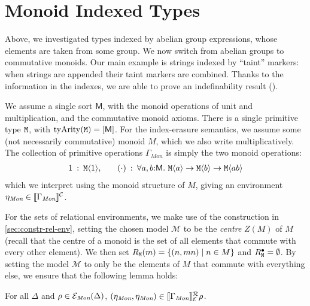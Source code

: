 \section{Monoid Indexed Types}
\label{sec:monoid-indexed-types}

\newcommand{\Mon}{\textit{Mon}}

Above, we investigated types indexed by abelian group expressions,
whose elements are taken from some group. We now switch from abelian
groups to commutative monoids.  Our main example is strings indexed by
``taint'' markers: when strings are appended their taint markers are
combined. Thanks to the information in the indexes, we are able to
prove an indefinability result ().

We assume a single sort $\mathsf{M}$, with the monoid operations of
unit and multiplication, and the commutative monoid axioms. There is a
single primitive type $\texttt{M}$, with $\mathrm{tyArity}(\texttt{M})
= [\mathsf{M}]$. For the index-erasure semantics, we assume some (not
necessarily commutative) monoid $M$, which we also write
multiplicatively. The collection of primitive operations
$\Gamma_{\mathit{Mon}}$ is simply the two monoid operations:
\begin{displaymath}
  \begin{array}{r@{\hspace{0.5em}:\hspace{0.5em}}l@{\hspace{2em}}r@{\hspace{0.5em}:\hspace{0.5em}}l}
    1 & \tyPrim{M}{1}, &
    (\cdot) & \forall a,b\mathord:\mathsf{M}.\ \tyPrim{M}{a} \to \tyPrim{M}{b} \to \tyPrim{M}{a b}
  \end{array}
\end{displaymath}
which we interpret using the monoid structure of $M$, giving an
environment $\eta_\Mon \in \ctxtSem{\Gamma_\Mon}$.

For the sets of relational environments, we make use of the
construction in \autoref{sec:constr-rel-env}, setting the chosen model
$\mathcal{M}$ to be the \emph{centre} $Z(M)$ of $M$ (recall that the
centre of a monoid is the set of all elements that commute with every
other element). We then set $R_{\texttt{M}}(m) = \{ (n,mn) \mathrel| n
\in M \}$ and $R^\bullet_{\texttt{M}} = \emptyset$. By setting the
model $\mathcal{M}$ to only be the elements of $M$ that commute with
everything else, we ensure that the following lemma holds:
\begin{lemma}
  For all $\Delta$ and $\rho \in \relEnv{E}_\Mon(\Delta)$,
  $(\eta_\Mon,\eta_\Mon) \in \rsem{\Gamma_\Mon}{\relEnv{E}}\rho$.
\end{lemma}

